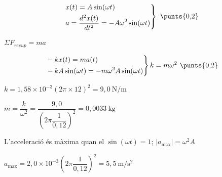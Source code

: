 \begin{solapartat}
\[ \left.\begin{aligned} &x(t) = A\sin(\omega t)\\ &a = \frac{d^2x(t)}{dt^2} = -A\omega^2\sin(\omega t)\end{aligned}\right\}\ \text{\punts{0,2}} \]

 $\Sigma F_{recup} = ma$

\[ \left.\begin{aligned} &-kx(t) = ma(t)\\ &-kA\sin(\omega t) = -m\omega^2 A\sin(\omega t)\end{aligned}\right\} k = m\omega^2\ \text{\punts{0,2}} \]

 $k = 1,58\times 10^{-3}(2\pi\times 12)^2 = 9,0\ \mathrm{N/m}$
\end{solapartat}

\begin{solapartat}
 $m = \dfrac{k}{\omega^2} = \dfrac{9,0}{\left(2\pi\dfrac{1}{0,12}\right)^2} = 0,0033\ \mathrm{kg}$

 L'acceleració és màxima quan el $\sin(\omega t) = 1$; $|a_{\max}| = \omega^2 A$

 $a_{\max} = 2,0\times 10^{-3}\left(2\pi\dfrac{1}{0,12}\right)^2 = 5,5\ \mathrm{m/s^2}$
\end{solapartat}
